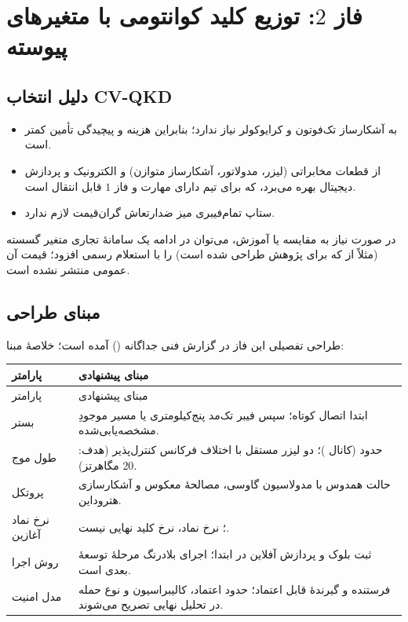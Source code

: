 \section{فاز $2$: توزیع کلید کوانتومی با متغیرهای پیوسته}
\label{sec:phase2}
\subsection{دلیل انتخاب CV-QKD}
\begin{itemize}[leftmargin=*,itemsep=2pt]
\item به آشکارساز تک‌فوتون و کرایوکولر نیاز ندارد؛ بنابراین هزینه و پیچیدگی تأمین کمتر است.
\item از قطعات مخابراتی (لیزر، مدولاتور، آشکارساز متوازن) و الکترونیک و پردازش دیجیتال بهره می‌برد، که برای تیم دارای مهارت  و  فاز $1$ قابل انتقال است.
\item ستاپ تمام‌فیبری میز ضدارتعاش گران‌قیمت لازم ندارد.
\end{itemize}
در صورت نیاز به مقایسه یا آموزش، می‌توان در ادامه یک سامانهٔ تجاری متغیر گسسته (مثلاً  از  که برای پژوهش طراحی شده است) را با استعلام رسمی افزود؛ قیمت آن عمومی منتشر نشده است.

\subsection{مبنای طراحی}
طراحی تفصیلی این فاز در گزارش فنی جداگانه () آمده است\cite{cvreport}؛ خلاصهٔ مبنا:
\begin{longtable}{R{3.95cm}R{11.37cm}}
\toprule {} پارامتر & مبنای پیشنهادی \\ \midrule
\endfirsthead
\toprule {} پارامتر & مبنای پیشنهادی \\ \midrule
\endhead
بستر & ابتدا اتصال کوتاه؛ سپس فیبر تک‌مد پنج‌کیلومتری یا مسیر موجودِ مشخصه‌یابی‌شده. \\
طول موج & حدود  (کانال )؛ دو لیزر مستقل با اختلاف فرکانس کنترل‌پذیر (هدف: $20$ مگاهرتز). \\
پروتکل & حالت همدوس با مدولاسیون گاوسی، مصالحهٔ معکوس و آشکارسازی هتروداین. \\
نرخ نماد آغازین & ؛ نرخ نماد، نرخ کلید نهایی نیست. \\
روش اجرا & ثبت بلوک و پردازش آفلاین در ابتدا؛ اجرای بلادرنگ مرحلهٔ توسعهٔ بعدی است. \\
مدل امنیت & فرستنده و گیرندهٔ قابل اعتماد؛ حدود اعتماد، کالیبراسیون و نوع حمله در تحلیل نهایی تصریح می‌شوند. \\
\bottomrule\end{longtable}

